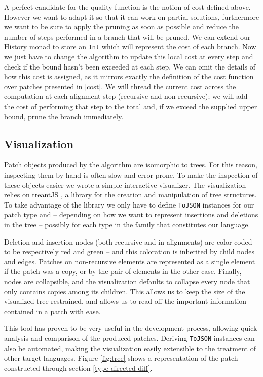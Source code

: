 \documentclass[11pt, titlepage]{article}
\newcommand{\toHaskell}[1]{\texttt{#1}\xspace}
\begin{document}
A perfect candidate for the quality function is the notion of cost defined above. However we want to adapt it so that it can work on partial solutions, furthermore we want to be sure to apply the pruning as soon as possible and reduce the number of steps performed in a branch that will be pruned.
We can extend our History monad to store an \texttt{Int} which will represent the cost of each branch. Now we just have to change the algorithm to update this local cost at every step and check if the bound hasn't been exceeded at each step. 
We can omit the details of how this cost is assigned, as it mirrors exactly the definition of the cost function over patches presented in \ref{cost}. 
We will thread the current cost across the computation at each alignment step (recursive and non-recursive); we will add the cost of performing that step to the total and, if we exceed the supplied upper bound, prune the branch immediately.

\subsection{Visualization}\label{viz}

Patch objects produced by the algorithm are isomorphic to trees. For this reason, inspecting them by hand is often slow and error-prone. To make the inspection of these objects easier we wrote a simple interactive visualizer. 
The visualization relies on treantJS \cite{treant}, a library for the creation and manipulation of tree structures. To take advantage of the library we only have to define \texttt{ToJSON} instances for our patch type and -- depending on how we want to represent insertions and deletions in the tree -- possibly for each type in the family that constitutes our language.

Deletion and insertion nodes (both recursive and in alignments) are color-coded to be respectively red and green -- and this coloration is inherited by child nodes and edges. 
Patches on non-recursive elements are represented as a single element if the patch was a copy, or by the pair of elements in the other case. 
Finally, nodes are collapsible, and the visualization defaults to collapse every node that only contains copies among its children. This allows us to keep the size of the visualized tree restrained, and allows us to read off the important information contained in a patch with ease.

This tool has proven to be very useful in the development process, allowing quick analysis and comparison of the produced patches. Deriving \toHaskell{ToJSON} instances can also be automated, making the visualization easily extensible to the treatment of other target languages.
Figure \ref{fig:tree} shows a representation of the patch constructed through section \ref{type-directed-diff}. 
\end{document}

